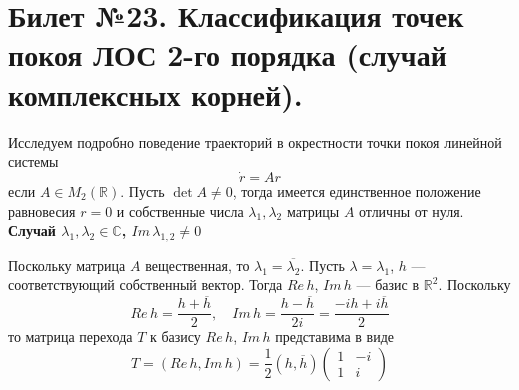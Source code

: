 \documentclass{article}
\begin{document}
\section{Билет №23. Классификация точек покоя ЛОС 2-го порядка (случай комплексных корней).}
Исследуем подробно поведение траекторий в окрестности точки покоя линейной системы
\begin{equation*}
    \dot{r} = Ar
\end{equation*}
если $A \in M_2(\mathbb{R})$. Пусть $\det A \neq 0$, тогда имеется единственное положение равновесия $r = 0$ и собственные числа $\lambda_1, \lambda_2$ матрицы $A$ отличны от нуля.\\

\noindent \textbf{Случай $\lambda_1, \lambda_2 \in \mathbb{C}$, $Im\, \lambda_{1,2} \neq 0$}

Поскольку матрица $A$ вещественная, то $\lambda_1 = \overline{\lambda_2}$. Пусть $\lambda = \lambda_1$, $h$ --- соответствующий собственный вектор. Тогда $Re\, h$, $Im\, h$ --- базис в $\mathbb{R}^2$. Поскольку
\begin{equation*}
    Re\, h = \frac{h + \overline{h}}{2}, \quad Im\, h = \frac{h - \overline{h}}{2i} = \frac{-ih + i\overline{h}}{2}
\end{equation*}
то матрица перехода $T$ к базису $Re\, h$, $Im\, h$ представима в виде
\begin{equation*}
    T = (Re\, h, Im\, h) = \frac{1}{2}(h,\overline{h})
    \begin{pmatrix}
    1 & -i\\
    1 & i
    \end{pmatrix}
\end{equation*}
\end{document}
